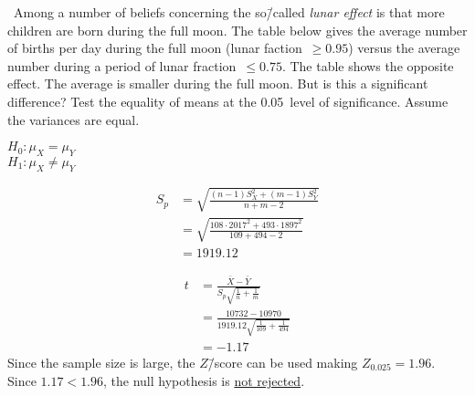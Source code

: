 \begin{problem}
  ~Among a number of beliefs concerning the so\=/called \textit{lunar effect} is that more children are born during the full moon.  The table below gives the average number of births per day during the full moon (lunar faction~${{\geq}0.95}$) versus the average number during a period of lunar fraction~${{\leq} 0.75}$. The table shows the opposite effect.  The average is smaller during the full moon. But is this a significant difference? Test the equality of means at the 0.05~level of significance.  Assume the variances are equal.
\end{problem}

\noindent
${H_0: \mu_{X} = \mu_{Y}}$ \\
${H_1: \mu_{X} \ne \mu_{Y}}$

\begin{align}
  S_{p} &= \sqrt{\frac{(n-1)S^{2}_{X} + (m-1)S^{2}_{Y}}{n + m - 2}} \\
        &= \sqrt{\frac{108 \cdot 2017^2 + 493 \cdot 1897^2}{109 + 494 - 2}} \\
        &= 1919.12
\end{align}

\begin{align}
  t &= \frac{\bar{X} - \bar{Y}}{S_{p} \sqrt{\frac{1}{n} + \frac{1}{m}}} \\
    &= \frac{10732 - 10970}{1919.12 \sqrt{\frac{1}{109} + \frac{1}{494}}} \\
    &= -1.17
\end{align}
Since the sample size is large, the $Z$\=/score can be used making ${Z_{0.025} = 1.96}$.  Since ${1.17 < 1.96}$, the null hypothesis is \underline{not rejected}.
